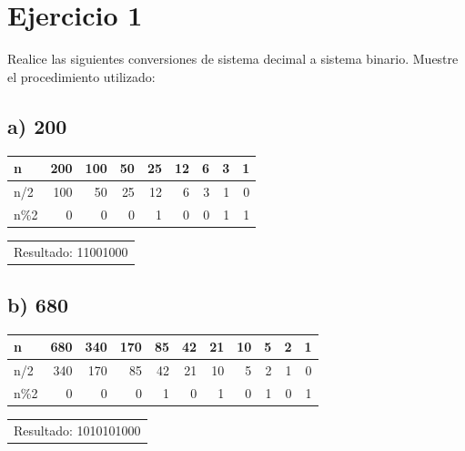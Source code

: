 \documentclass[12pt]{article}
\begin{document}
\section*{Ejercicio 1}
\label{sec:orgfec3dd7}
Realice las siguientes conversiones de sistema decimal a sistema binario. Muestre el procedimiento utilizado:

\subsection*{a) 200}
\label{sec:orgb3348e7}
\begin{mdframed}
\begin{center}
\begin{tabular}{lrrrrrrrr}
n & 200 & 100 & 50 & 25 & 12 & 6 & 3 & 1\\
\hline
n/2 & 100 & 50 & 25 & 12 & 6 & 3 & 1 & 0\\
n\%2 & 0 & 0 & 0 & 1 & 0 & 0 & 1 & 1\\
\end{tabular}
\end{center}

\begin{center}
\begin{tabular}{l}
Resultado: 11001000\\
\end{tabular}
\end{center}
\end{mdframed}

\subsection*{b) 680}
\label{sec:org70e3bd8}
\begin{mdframed}
\begin{center}
\begin{tabular}{lrrrrrrrrrr}
n & 680 & 340 & 170 & 85 & 42 & 21 & 10 & 5 & 2 & 1\\
\hline
n/2 & 340 & 170 & 85 & 42 & 21 & 10 & 5 & 2 & 1 & 0\\
n\%2 & 0 & 0 & 0 & 1 & 0 & 1 & 0 & 1 & 0 & 1\\
\end{tabular}
\end{center}

\begin{center}
\begin{tabular}{l}
Resultado: 1010101000\\
\end{tabular}
\end{center}
\end{mdframed}
\end{document}
